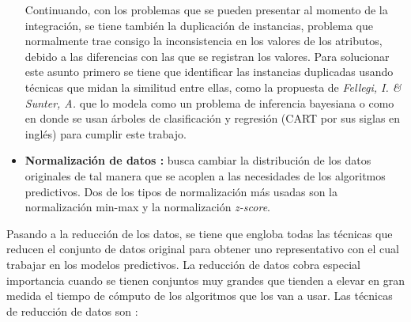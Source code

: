 \begin{itemize}
Continuando, con los problemas que se pueden presentar al momento de la integración, se tiene también la duplicación de instancias, problema que normalmente trae consigo la inconsistencia en los valores de los atributos, debido a las diferencias con las que se registran los valores. Para solucionar este asunto primero se tiene que identificar las instancias duplicadas usando técnicas que midan la similitud entre ellas, como la propuesta de \emph{Fellegi, I. \& Sunter, A.} \cite{fellegi1969theory} que lo modela como un problema de inferencia bayesiana o como en \cite{cochinwala2001efficient} donde se usan árboles de clasificación y regresión (CART por sus siglas en inglés) para cumplir este trabajo.

\item \textbf{Normalización de datos \cite{garcia2016data}:}
busca cambiar la distribución de los datos originales de tal manera que se acoplen a las necesidades de los algoritmos predictivos. Dos de los tipos de normalización más usadas son la normalización min-max y la normalización \emph{z-score}.

\end{itemize}

Pasando a la reducción de los datos, se tiene que engloba todas las técnicas que reducen el conjunto de datos original para obtener uno representativo con el cual trabajar en los modelos predictivos. La reducción de datos cobra especial importancia cuando se tienen conjuntos muy grandes que tienden a elevar en gran medida el tiempo de cómputo de los algoritmos que los van a usar. Las técnicas de reducción de datos son \cite{garcia2016data}:

